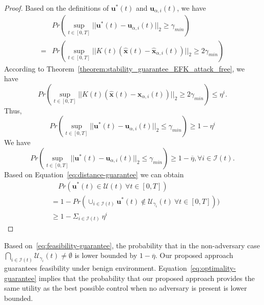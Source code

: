 \documentclass[journal]{IEEEtran}
\begin{document}
\begin{proof}
Based on the definitions of $\mathbf{u}^{\ast}(t)$ and $\mathbf{u}_{\alpha,i}(t)$, we have
\begin{equation*}
    \begin{array}{ll}
        &Pr(\sup_{t \in [0,T]}{||\mathbf{u}^{\ast}(t)-\mathbf{u}_{\alpha,i}(t)||_{2}} \geq \gamma_{min}) \\
        = &Pr(\sup_{t \in [0,T]}{||K(t)(\hat{\mathbf{x}}(t)-\hat{\mathbf{x}}_{\alpha,i}(t))||_{2}} \geq 2\gamma_{min})
    \end{array}
\end{equation*}
According to Theorem~\ref{theorem:stability_guarantee_EFK_attack_free}, we have $$Pr(\sup_{t \in [0,T]}{||K(t)(\hat{\mathbf{x}}(t)-\hat{\mathbf{x}}_{\alpha,i}(t))||_{2}} \geq 2\gamma_{min}) \leq \eta^i.$$ Thus,
\begin{equation}
\label{eq:distance-guarantee}
    Pr(\sup_{t \in [0,T]}{||\mathbf{u}^{\ast}(t)-\mathbf{u}_{\alpha,i}(t)||_{2}} \leq \gamma_{min}) \geq 1 - \eta^i
\end{equation}
We have 
\begin{equation}
\label{eq:feasibility-guarantee}
    Pr(\sup_{t \in [0,T]}{||\mathbf{u}^{\ast}(t)-\mathbf{u}_{\alpha,i}(t)||_{2}} \leq \gamma_{min}) \geq 1 - \overline{\eta}, \forall i \in \mathcal{I}(t).
\end{equation}
Based on Equation~\eqref{eq:distance-guarantee} we can obtain
\begin{align}
    &\quad Pr\left(\mathbf{u}^{\ast}(t) \in \mathcal{U}(t) \ \forall t \in [0,T] \right) \nonumber\\
    &= 1 - Pr(\cup_{i \in \mathcal{I}(t)} \mathbf{u}^{\ast}(t) \notin \mathcal{U}_{\gamma_i}(t) \ \forall t \in [0,T]) ) \nonumber\\
    &\geq 1 - \Sigma_{i \in \mathcal{I}(t) }  \ \eta^i \label{eq:optimality-guarantee}
\end{align}
\end{proof}

Based on~\eqref{eq:feasibility-guarantee}, the probability that in the non-adversary case 
$\bigcap_{i \in \mathcal{I}(t)}{\mathcal{U}_{\gamma_{i}}(t)} \neq \emptyset$ is lower bounded by $1 - \overline{\eta}$. Our proposed approach guarantees feasibility under benign environment. Equation~\eqref{eq:optimality-guarantee} implies that the probability that our proposed approach provides the same utility as the best possible control when no adversary is present is lower bounded.
\end{document}
